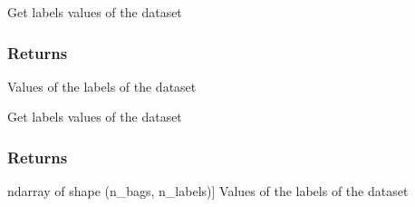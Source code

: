 \documentclass[letterpaper,10pt,english]{sphinxmanual}
\begin{document}
\begin{fulllineitems}
\begin{fulllineitems}
\begin{description}
\end{description}

\end{fulllineitems}


\begin{fulllineitems}
\label{\detokenize{data/_autosummary/miml.data.miml_dataset.MIMLDataset:miml.data.miml_dataset.MIMLDataset.get_labels}}
\pysigstartsignatures
{}
\pysigstopsignatures
\sphinxAtStartPar
Get labels values of the dataset


\subsubsection{Returns}
\label{\detokenize{data/_autosummary/miml.data.miml_dataset.MIMLDataset:id19}}\begin{description}
\sphinxAtStartPar
Values of the labels of the dataset

\end{description}

\end{fulllineitems}


\begin{fulllineitems}
\label{\detokenize{data/_autosummary/miml.data.miml_dataset.MIMLDataset:miml.data.miml_dataset.MIMLDataset.get_labels_by_bag}}
\pysigstartsignatures
{}
\pysigstopsignatures
\sphinxAtStartPar
Get labels values of the dataset


\subsubsection{Returns}
\label{\detokenize{data/_autosummary/miml.data.miml_dataset.MIMLDataset:id20}}\begin{description}
\sphinxlineitem{labels}{[}ndarray of shape (n\_bags, n\_labels){]}
\sphinxAtStartPar
Values of the labels of the dataset

\end{description}


\end{fulllineitems}
\end{fulllineitems}
\end{document}
